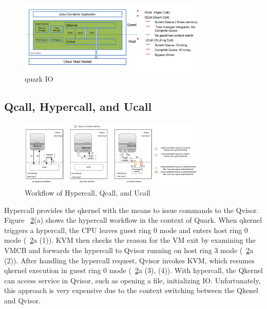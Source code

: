 \begin{figure}[H]
    \centering
    \includegraphics[width=0.8\textwidth]{images/quark_io.png}
    \caption[quark IO]{quark IO}
    \label{fig:quark_io}
\end{figure}


\subsection{Qcall, Hypercall, and Ucall}
\label{Qcall_hypercall_ucall}
\begin{figure}[H]
  \centering
  \includegraphics[width=0.8\textwidth]{images/hypercall_qcall_ucall.pdf}
  \caption[Workflow of Hypercall, Qcall, and Ucall]{Workflow of Hypercall, Qcall, and Ucall}
  \label{fig:hypercall_qcall_ucall}
\end{figure}
Hypercall provides the qkernel with the means to issue commands to the Qvisor. Figure ~\ref{fig:hypercall_qcall_ucall}(a) shows the hypercall workflow in the context of Quark. 
When qkernel triggers a hypercall, the CPU leaves guest ring 0 mode and enters host ring 0 mode (~\ref{fig:hypercall_qcall_ucall}a (1)). KVM then checks the reason for the VM exit by examining the VMCB and forwards the 
hypercall to Qvisor running on host ring 3 mode (~\ref{fig:hypercall_qcall_ucall}a (2)). After handling the hypercall request, Qvisor invokes KVM, which resumes qkernel execution in guest ring 0 mode (~\ref{fig:hypercall_qcall_ucall}a (3), (4)).
With hypercall, the Qkernel can access service in Qvisor, such as opening a file, initializing IO. Unfortunately, 
this approach is very expensive due to the context switching between the Qkenel and Qvisor. 

